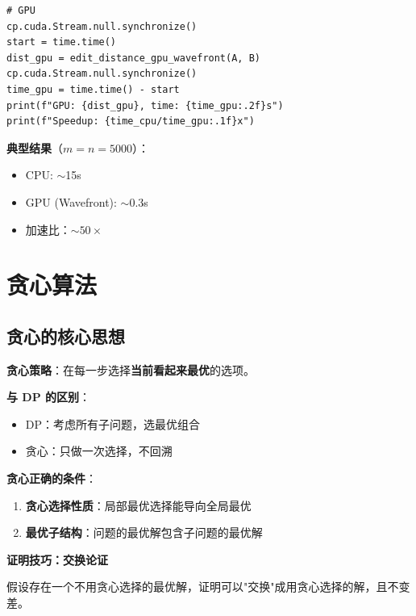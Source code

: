 \documentclass[12pt, a4paper]{ctexart}
\begin{document}
\begin{experiment}
\begin{lstlisting}
# GPU
cp.cuda.Stream.null.synchronize()
start = time.time()
dist_gpu = edit_distance_gpu_wavefront(A, B)
cp.cuda.Stream.null.synchronize()
time_gpu = time.time() - start
print(f"GPU: {dist_gpu}, time: {time_gpu:.2f}s")
print(f"Speedup: {time_cpu/time_gpu:.1f}x")
\end{lstlisting}

\textbf{典型结果}（$m = n = 5000$）：
\begin{itemize}
    \item CPU: $\sim$15s
    \item GPU (Wavefront): $\sim$0.3s
    \item 加速比：$\sim 50\times$
\end{itemize}
\end{experiment}

\section{贪心算法}

\subsection{贪心的核心思想}

\begin{blackboard}[贪心算法的结构]

\textbf{贪心策略}：在每一步选择\textbf{当前看起来最优}的选项。

\textbf{与 DP 的区别}：
\begin{itemize}
    \item DP：考虑所有子问题，选最优组合
    \item 贪心：只做一次选择，不回溯
\end{itemize}

\textbf{贪心正确的条件}：

\begin{enumerate}
    \item \textbf{贪心选择性质}：局部最优选择能导向全局最优
    \item \textbf{最优子结构}：问题的最优解包含子问题的最优解
\end{enumerate}

\textbf{证明技巧：交换论证}

假设存在一个不用贪心选择的最优解，证明可以"交换"成用贪心选择的解，且不变差。

\end{blackboard}
\end{document}
